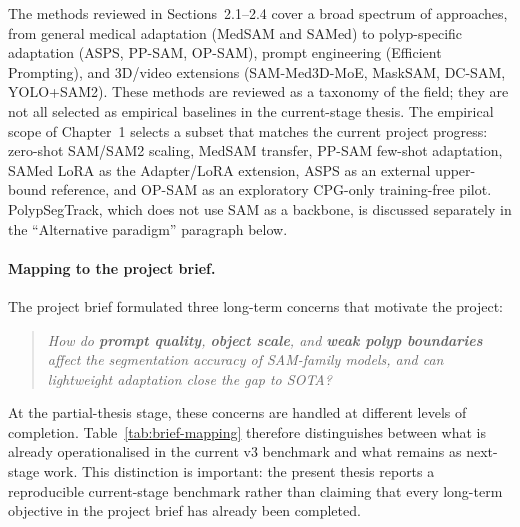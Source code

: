 The methods reviewed in Sections~2.1--2.4 cover a broad spectrum of approaches, from general medical adaptation (MedSAM and SAMed) to polyp-specific adaptation (ASPS, PP-SAM, OP-SAM), prompt engineering (Efficient Prompting), and 3D/video extensions (SAM-Med3D-MoE, MaskSAM, DC-SAM, YOLO+SAM2). These methods are reviewed as a taxonomy of the field; they are not all selected as empirical baselines in the current-stage thesis. The empirical scope of Chapter~1 selects a subset that matches the current project progress: zero-shot SAM/SAM2 scaling, MedSAM transfer, PP-SAM few-shot adaptation, SAMed LoRA as the Adapter/LoRA extension, ASPS as an external upper-bound reference, and OP-SAM as an exploratory CPG-only training-free pilot. PolypSegTrack, which does not use SAM as a backbone, is discussed separately in the ``Alternative paradigm'' paragraph below.

\paragraph{Mapping to the project brief.}
The project brief formulated three long-term concerns that motivate the project:
\begin{quote}\emph{How do \textbf{prompt quality}, \textbf{object scale}, and \textbf{weak polyp boundaries} affect the segmentation accuracy of SAM-family models, and can lightweight adaptation close the gap to SOTA?}\end{quote}
At the partial-thesis stage, these concerns are handled at different levels of completion. Table~\ref{tab:brief-mapping} therefore distinguishes between what is already operationalised in the current v3 benchmark and what remains as next-stage work. This distinction is important: the present thesis reports a reproducible current-stage benchmark rather than claiming that every long-term objective in the project brief has already been completed.

